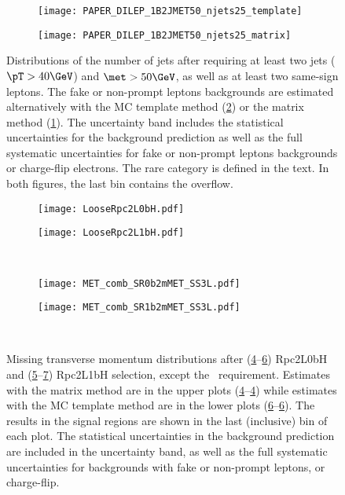 \begin{figure}[htb!]
\begin{subfigure}[t]{0.49\textwidth}\texttt{[image: PAPER\_DILEP\_1B2JMET50\_njets25\_template]}\caption{}\label{fig:VR1b2j_MxM}\end{subfigure}
\begin{subfigure}[t]{0.49\textwidth}\texttt{[image: PAPER\_DILEP\_1B2JMET50\_njets25\_matrix]}\caption{}\label{fig:VR1b2j_MCT}\end{subfigure}
\caption{
Distributions of the number of jets after requiring at least two jets ($\pT> 40 \GeV$) and $\met> 50 \GeV$, 
as well as at least two same-sign leptons. 
The fake or non-prompt leptons backgrounds are estimated alternatively with the MC template method (\ref{fig:VR1b2j_MCT}) or the matrix method (\ref{fig:VR1b2j_MxM}). 
The uncertainty band includes the statistical uncertainties for the background prediction as well as the
full systematic uncertainties for fake or non-prompt leptons backgrounds or charge-flip electrons. 
The rare category is defined in the text. In both figures, the last bin contains the overflow.
}
\label{fig:bkg.val.mctVSmxm}
\end{figure}


\begin{figure}[htb!]
\begin{subfigure}[t]{0.49\textwidth}\texttt{[image: LooseRpc2L0bH.pdf]}\caption{}\label{fig:bkg.val.Rpc2L0bH.MxM}\end{subfigure}
\begin{subfigure}[t]{0.49\textwidth}\texttt{[image: LooseRpc2L1bH.pdf]}\caption{}\label{fig:bkg.val.Rpc2L1bH.MxM}\end{subfigure} \\
\begin{subfigure}[t]{0.49\textwidth}\texttt{[image: MET\_comb\_SR0b2mMET\_SS3L.pdf]}\caption{}\label{fig:bkg.val.Rpc2L0bH.MCT}\end{subfigure}
\begin{subfigure}[t]{0.49\textwidth}\texttt{[image: MET\_comb\_SR1b2mMET\_SS3L.pdf]}\caption{}\label{fig:bkg.val.Rpc2L1bH.MCT}\end{subfigure} \\
\caption{
Missing transverse momentum distributions after (\ref{fig:bkg.val.Rpc2L0bH.MxM}--\ref{fig:bkg.val.Rpc2L0bH.MCT}) Rpc2L0bH 
and (\ref{fig:bkg.val.Rpc2L1bH.MxM}--\ref{fig:bkg.val.Rpc2L1bH.MCT}) Rpc2L1bH selection, except the \met~requirement. 
Estimates with the matrix method are in the upper plots (\ref{fig:bkg.val.Rpc2L0bH.MxM}--\ref{fig:bkg.val.Rpc2L0bH.MxM})
while estimates with the MC template method are in the lower plots (\ref{fig:bkg.val.Rpc2L0bH.MCT}--\ref{fig:bkg.val.Rpc2L0bH.MCT}).
The results in the signal regions are shown in the last (inclusive) bin of each plot. 
The statistical uncertainties in the background prediction are included in the uncertainty
band, as well as the full systematic uncertainties for backgrounds with fake or non-prompt leptons, or charge-flip.
}
\label{fig:bkg.val.met}
\end{figure}


